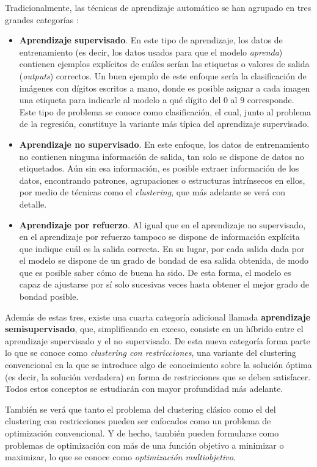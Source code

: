 Tradicionalmente, las técnicas de aprendizaje automático se han agrupado en tres grandes categorías \cite{abu2012learning}:
\begin{itemize}
	\item \textbf{Aprendizaje supervisado}. En este tipo de aprendizaje, los datos de entrenamiento (es decir, los datos usados para que el modelo \emph{aprenda}) contienen ejemplos explícitos de cuáles serían las etiquetas o valores de salida (\emph{outputs}) correctos. Un buen ejemplo de este enfoque sería la clasificación de imágenes con dígitos escritos a mano, donde es posible asignar a cada imagen una etiqueta para indicarle al modelo a qué dígito del $0$ al $9$ corresponde. Este tipo de problema se conoce como clasificación, el cual, junto al problema de la regresión, constituye la variante más típica del aprendizaje supervisado.
	\item \textbf{Aprendizaje no supervisado}. En este enfoque, los datos de entrenamiento no contienen ninguna información de salida, tan solo se dispone de datos no etiquetados. Aún sin esa información, es posible extraer información de los datos, encontrando patrones, agrupaciones o estructuras intrínsecos en ellos, por medio de técnicas como el \emph{clustering}, que más adelante se verá con detalle.
	\item \textbf{Aprendizaje por refuerzo}. Al igual que en el aprendizaje no supervisado, en el aprendizaje por refuerzo tampoco se dispone de información explícita que indique cuál es la salida correcta. En su lugar, por cada salida dada por el modelo se dispone de un grado de bondad de esa salida obtenida, de modo que es posible saber cómo de buena ha sido. De esta forma, el modelo es capaz de ajustarse por sí solo sucesivas veces hasta obtener el mejor grado de bondad posible.
\end{itemize}

Además de estas tres, existe una cuarta categoría adicional llamada \textbf{aprendizaje semisupervisado}, que, simplificando en exceso, consiste en un híbrido entre el aprendizaje supervisado y el no supervisado. De esta nueva categoría forma parte lo que se conoce como \emph{clustering con restricciones}, una variante del clustering convencional en la que se introduce algo de conocimiento sobre la solución óptima (es decir, la solución verdadera) en forma de restricciones que se deben satisfacer. Todos estos conceptos se estudiarán con mayor profundidad más adelante.

También se verá que tanto el problema del clustering clásico como el del clustering con restricciones pueden ser enfocados como un problema de optimización convencional. Y de hecho, también pueden formularse como problemas de optimización con más de una función objetivo a minimizar o maximizar, lo que se conoce como \emph{optimización multiobjetivo}.

